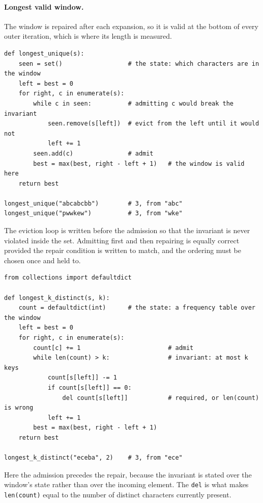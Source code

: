 \newpage

\paragraph{Longest valid window.} The window is repaired after each expansion,
so it is valid at the bottom of every outer iteration, which is where its length
is measured.

\begin{lstlisting}[style=python, caption={Longest substring with no repeated character}]
def longest_unique(s):
    seen = set()                  # the state: which characters are in the window
    left = best = 0
    for right, c in enumerate(s):
        while c in seen:          # admitting c would break the invariant
            seen.remove(s[left])  # evict from the left until it would not
            left += 1
        seen.add(c)               # admit
        best = max(best, right - left + 1)   # the window is valid here
    return best

longest_unique("abcabcbb")        # 3, from "abc"
longest_unique("pwwkew")          # 3, from "wke"
\end{lstlisting}

The eviction loop is written before the admission so that the invariant is never
violated inside the set. Admitting first and then repairing is equally correct
provided the repair condition is written to match, and the ordering must be
chosen once and held to.

\begin{lstlisting}[style=python, caption={Longest substring with at most k distinct characters}]
from collections import defaultdict

def longest_k_distinct(s, k):
    count = defaultdict(int)      # the state: a frequency table over the window
    left = best = 0
    for right, c in enumerate(s):
        count[c] += 1                        # admit
        while len(count) > k:                # invariant: at most k keys
            count[s[left]] -= 1
            if count[s[left]] == 0:
                del count[s[left]]           # required, or len(count) is wrong
            left += 1
        best = max(best, right - left + 1)
    return best

longest_k_distinct("eceba", 2)    # 3, from "ece"
\end{lstlisting}

Here the admission precedes the repair, because the invariant is stated over the
window's state rather than over the incoming element. The \texttt{del} is what
makes \texttt{len(count)} equal to the number of distinct characters currently
present.

